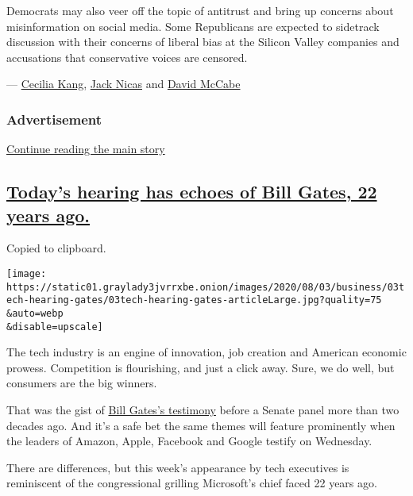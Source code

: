 Democrats may also veer off the topic of antitrust and bring up concerns
about misinformation on social media. Some Republicans are expected to
sidetrack discussion with their concerns of liberal bias at the Silicon
Valley companies and accusations that conservative voices are censored.

--- \href{https://www.nytimes3xbfgragh.onion/by/cecilia-kang}{Cecilia
Kang}, \href{https://www.nytimes3xbfgragh.onion/by/jack-nicas}{Jack
Nicas} and
\href{https://www.nytimes3xbfgragh.onion/by/david-mccabe}{David McCabe}

\hypertarget{advertisement-3}{%
\subsubsection{Advertisement}\label{advertisement-3}}

\protect\hyperlink{after-dfp-ad-mid1}{Continue reading the main story}

\hypertarget{todays-hearing-has-echoes-of-bill-gates-22-years-ago}{%
\subsection{\texorpdfstring{\protect\hyperlink{todays-hearing-has-echoes-of-bill-gates-22-years-ago}{Today's
hearing has echoes of Bill Gates, 22 years
ago.}}{Today's hearing has echoes of Bill Gates, 22 years ago.}}\label{todays-hearing-has-echoes-of-bill-gates-22-years-ago}}

Copied to clipboard.

\texttt{[image: https://static01.graylady3jvrrxbe.onion/images/2020/08/03/business/03tech-hearing-gates/03tech-hearing-gates-articleLarge.jpg?quality=75\\\&auto=webp\\\&disable=upscale]}

The tech industry is an engine of innovation, job creation and American
economic prowess. Competition is flourishing, and just a click away.
Sure, we do well, but consumers are the big winners.

That was the gist of
\href{https://archive.nytimes3xbfgragh.onion/www.nytimes3xbfgragh.onion/library/tech/98/03/biztech/articles/04microsoft.html}{Bill
Gates's testimony} before a Senate panel more than two decades ago. And
it's a safe bet the same themes will feature prominently when the
leaders of Amazon, Apple, Facebook and Google testify on Wednesday.

There are differences, but this week's appearance by tech executives is
reminiscent of the congressional grilling Microsoft's chief faced 22
years ago.

